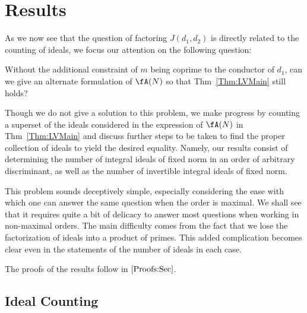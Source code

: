 \documentclass[11pt, proquest]{uwthesis}
\begin{document}
\chapter{Results}\label{Progress:Sec}

As we now see that the question of factoring $J(d_1,d_2)$ is directly related to the counting of ideals, we focus our attention on the following question:

\begin{question}
  Without the additional constraint of $m$ being coprime to the conductor of $d_1$, can we give an alternate formulation of $\fA(N)$ so that Thm~\ref{Thm:LVMain} still holds?
\end{question}

Though we do not give a solution to this problem, we make progress by counting a superset of the ideals considered in the expression of $\fA(N)$ in Thm~\ref{Thm:LVMain} and discuss further steps to be taken to find the proper collection of ideals to yield the desired equality.
Namely, our results consist of determining the number of integral ideals of fixed norm in an order of arbitrary discriminant, as well as the number of invertible integral ideals of fixed norm.

This problem sounds deceptively simple, especially considering the ease with which one can answer the same question when the order is maximal.
We shall see that it requires quite a bit of delicacy to answer most questions when working in non-maximal orders.
The main difficulty comes from the fact that we lose the factorization of ideals into a product of primes.
This added complication becomes clear even in the statements of the number of ideals in each case.

The proofs of the results follow in \textsection$\ref{Proofs:Sec}$.

\section{Ideal Counting}
\end{document}
